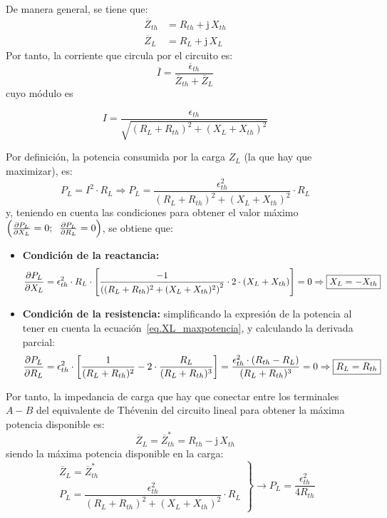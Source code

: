 De manera general, se tiene que:
\begin{align*}
  \overline{Z}_{th} &= R_{th} + \mathrm{j}\,X_{th}\\
  \overline{Z}_L &= R_L + \mathrm{j}\,X_L
\end{align*}
Por tanto, la corriente que circula por el circuito es:
\begin{equation*}
  \overline{I} = \frac{\overline{\epsilon}_{th}}{\overline{Z}_{th} + \overline{Z}_L}
\end{equation*}
cuyo módulo es

\begin{equation*}
  I=\frac{\epsilon_{th}}{\sqrt{(R_L+R_{th})^2+(X_L+X_{th})^2}}
\end{equation*}

Por definición, la potencia consumida por la carga $Z_L$ (la que hay que
maximizar), es:
\begin{equation*}
  P_L= I^2 \cdot R_L\Rightarrow P_L = \dfrac{\epsilon_{th}^2}{{(R_L+R_{th})^2+(X_L+X_{th})^2}} \cdot R_L
\end{equation*}
y, teniendo en cuenta las condiciones para obtener el valor máximo
$\left(\diffp{P_L}{X_L} = 0;\;\; \diffp{P_L}{R_L} = 0\right)$, se
obtiene que:
\begin{itemize}
\item \textbf{Condición de la reactancia:}
  \begin{equation}\label{eq.XL_maxpotencia}
    \diffp{P_L}{X_L} = \epsilon^2_{th} \cdot R_L \cdot \left[\frac{-1}{\left((R_L + R_{th})^2 + (X_L + X_{th})^2\right)^2} \cdot 2 \cdot (X_L + X_{th})\right]=0\Rightarrow \boxed{X_L = - X_{th}}
  \end{equation}
\item \textbf{Condición de la resistencia:} simplificando la expresión
  de la potencia al tener en cuenta la
  ecuación~\eqref{eq.XL_maxpotencia}, y calculando la derivada
  parcial:
  \begin{equation}\label{eq.R_maxpotencia}
    \diffp{P_L}{R_L} = \epsilon^2_{th} \cdot \left[\frac{1}{(R_L + R_{th})^2} - 2 \cdot \frac{R_L}{(R_L + R_{th})^3}\right]= \frac{\epsilon^2_{th} \cdot (R_{th} - R_L)}{(R_L + R_{th})^3}=0\Rightarrow \boxed{R_L = R_{th}}
  \end{equation}
\end{itemize}
Por tanto, la impedancia de carga que hay que conectar entre los
terminales $A-B$ del equivalente de Thévenin del circuito lineal para
obtener la máxima potencia disponible es:
\begin{equation}
  \boxed{\overline{Z}_L = \overline{Z}_{th}^*=R_{th}-\mathrm{j}\,X_{th}}
\end{equation}
siendo la máxima potencia disponible en la carga:
\begin{equation}
  \left.
    \begin{matrix}
      \overline{Z}_L = \overline{Z}_{th}^*\\
      P_L = \dfrac{\epsilon_{th}^2}{{(R_L+R_{th})^2+(X_L+X_{th})^2}} \cdot R_L
    \end{matrix} \right\}\rightarrow
  \boxed{P_L = \frac{\epsilon^2_{th}}{4 R_{th}}}
\end{equation}


